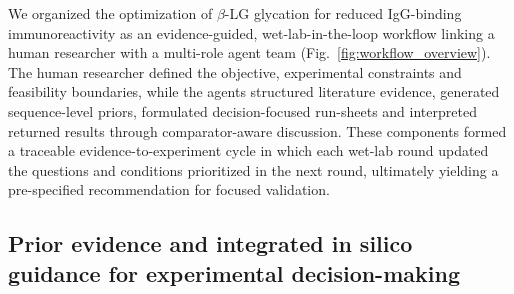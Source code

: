 We organized the optimization of $\beta$-LG glycation for reduced IgG-binding immunoreactivity as an evidence-guided, wet-lab-in-the-loop workflow linking a human researcher with a multi-role agent team (Fig.~\ref{fig:workflow_overview}). The human researcher defined the objective, experimental constraints and feasibility boundaries, while the agents structured literature evidence, generated sequence-level priors, formulated decision-focused run-sheets and interpreted returned results through comparator-aware discussion. These components formed a traceable evidence-to-experiment cycle in which each wet-lab round updated the questions and conditions prioritized in the next round, ultimately yielding a pre-specified recommendation for focused validation.

\subsection{Prior evidence and integrated in silico guidance for experimental decision-making}


